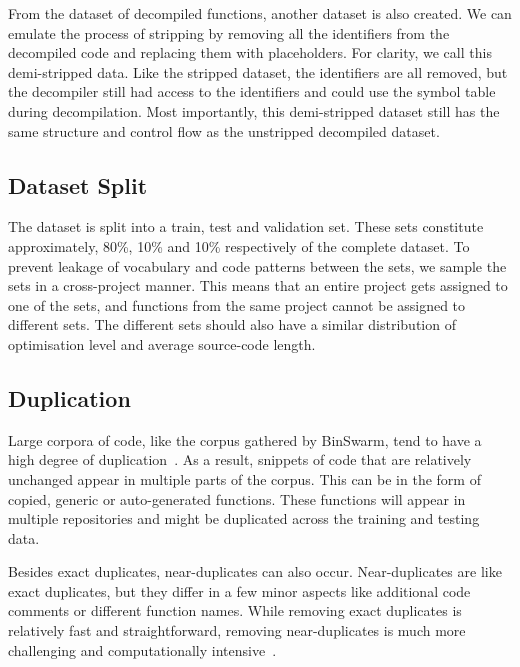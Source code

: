 From the dataset of decompiled functions, another dataset is also created. We can emulate the process of stripping by removing all the identifiers from the decompiled code and replacing them with placeholders. For clarity, we call this demi-stripped data. Like the stripped dataset, the identifiers are all removed, but the decompiler still had access to the identifiers and could use the symbol table during decompilation. Most importantly, this demi-stripped dataset still has the same structure and control flow as the unstripped decompiled dataset.

\subsection{Dataset Split}
The dataset is split into a train, test and validation set. These sets constitute approximately, 80\%, 10\% and 10\% respectively\cite{recommend_summarization} of the complete dataset. To prevent leakage of vocabulary and code patterns between the sets, we sample the sets in a cross-project manner. This means that an entire project gets assigned to one of the sets, and functions from the same project cannot be assigned to different sets. The different sets should also have a similar distribution of optimisation level and average source-code length.

\subsection{Duplication}
Large corpora of code, like the corpus gathered by BinSwarm, tend to have a high degree of duplication~\cite{recommend_summarization}. As a result, snippets of code that are relatively unchanged appear in multiple parts of the corpus. This can be in the form of copied, generic or auto-generated functions. These functions will appear in multiple repositories and might be duplicated across the training and testing data.

Besides exact duplicates, near-duplicates can also occur. Near-duplicates are like exact duplicates, but they differ in a few minor aspects like additional code comments or different function names. While removing exact duplicates is relatively fast and straightforward, removing near-duplicates is much more challenging and computationally intensive~\cite{allamanis_adverse}. 

